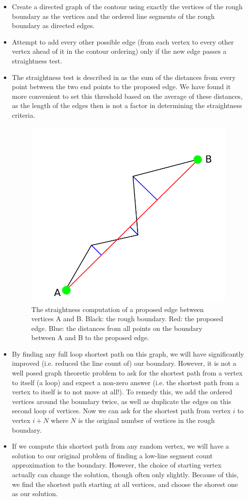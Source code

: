 \documentclass{InsightArticle}
\begin{document}
\begin{itemize}
 \item Create a directed graph of the contour using exactly the vertices of the rough boundary as the vertices and the ordered line segments of the rough boundary as directed edges.
 \item Attempt to add every other possible edge (from each vertex to every other vertex ahead of it in the contour ordering) only if the new edge passes a straightness test.
 \item The straightness test is described in \cite{WangThesis} as the sum of the distances from every point between the two end points to the proposed edge. We have found it more convenient to set this threshold based on the average of these distances, as the length of the edges then is not a factor in determining the straightness criteria.
\begin{figure}[H]
  \centering
  \includegraphics[width=0.3\linewidth]{images/straightness}
  \caption{The straightness computation of a proposed edge between vertices A and B. Black: the rough boundary. Red: the proposed edge. Blue: the distances from all points on the boundary between A and B to the proposed edge.}
  \label{fig:Straightness}
\end{figure}
 \item By finding any full loop shortest path on this graph, we will have significantly improved (i.e. reduced the line count of) our boundary. However, it is not a well posed graph theoretic problem to ask for the shortest path from a vertex to itself (a loop) and expect a non-zero answer (i.e. the shortest path from a vertex to itself is to not move at all!). To remedy this, we add the ordered vertices around the boundary twice, as well as duplicate the edges on this second loop of vertices. Now we can ask for the shortest path from vertex $i$ to vertex $i+N$ where $N$ is the original number of vertices in the rough boundary.
 \item If we compute this shortest path from any random vertex, we will have a solution to our original problem of finding a low-line segment count approximation to the boundary. However, the choice of starting vertex actually can change the solution, though often only slightly. Because of this, we find the shortest path starting at all vertices, and choose the shorest one as our solution.
\end{itemize}
\end{document}

